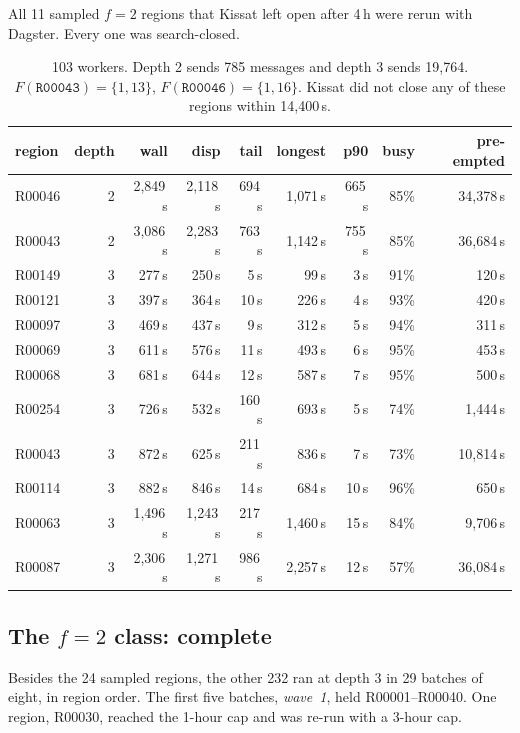 \documentclass[11pt,a4paper]{article}
\theoremstyle{definition}
\newcommand{\code}[1]{\texttt{#1}}
\begin{document}
All 11 sampled $f=2$ regions that Kissat left open after 4\,h were rerun with Dagster.
Every one was search-closed.

\begin{table}[H]
\centering
\small
\begin{tabular}{@{}lrrrrrrrr@{}}
\toprule
region & depth & wall & disp & tail & longest & p90 & busy & pre-empted \\
\midrule
R00046 & 2 & 2{,}849\,s & 2{,}118\,s & 694\,s & 1{,}071\,s & 665\,s & 85\% & 34{,}378\,s \\
R00043 & 2 & 3{,}086\,s & 2{,}283\,s & 763\,s & 1{,}142\,s & 755\,s & 85\% & 36{,}684\,s \\
\midrule
R00149 & 3 & 277\,s & 250\,s & 5\,s & 99\,s & 3\,s & 91\% & 120\,s \\
R00121 & 3 & 397\,s & 364\,s & 10\,s & 226\,s & 4\,s & 93\% & 420\,s \\
R00097 & 3 & 469\,s & 437\,s & 9\,s & 312\,s & 5\,s & 94\% & 311\,s \\
R00069 & 3 & 611\,s & 576\,s & 11\,s & 493\,s & 6\,s & 95\% & 453\,s \\
R00068 & 3 & 681\,s & 644\,s & 12\,s & 587\,s & 7\,s & 95\% & 500\,s \\
R00254 & 3 & 726\,s & 532\,s & 160\,s & 693\,s & 5\,s & 74\% & 1{,}444\,s \\
R00043 & 3 & 872\,s & 625\,s & 211\,s & 836\,s & 7\,s & 73\% & 10{,}814\,s \\
R00114 & 3 & 882\,s & 846\,s & 14\,s & 684\,s & 10\,s & 96\% & 650\,s \\
R00063 & 3 & 1{,}496\,s & 1{,}243\,s & 217\,s & 1{,}460\,s & 15\,s & 84\% & 9{,}706\,s \\
R00087 & 3 & 2{,}306\,s & 1{,}271\,s & 986\,s & 2{,}257\,s & 12\,s & 57\% & 36{,}084\,s \\
\bottomrule
\end{tabular}
\caption{103 workers. Depth 2 sends 785 messages and depth 3 sends 19{,}764.
$F(\code{R00043})=\{1,13\}$, $F(\code{R00046})=\{1,16\}$. Kissat did not close any of these
regions within 14{,}400\,s.}
\label{tab:f2}
\end{table}
\subsection{The $f=2$ class: complete}\label{sec:f2done}

Besides the 24 sampled regions, the other 232 ran at depth 3 in 29 batches of eight, in region order.
The first five batches, \emph{wave~1}, held R00001--R00040. One region, R00030, reached the 1-hour
cap and was re-run with a 3-hour cap.
\end{document}

